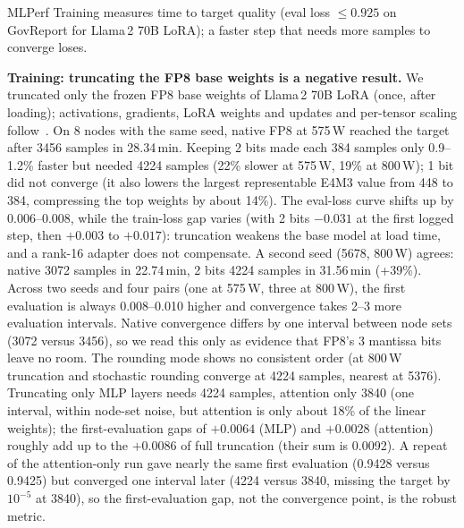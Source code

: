 \documentclass[conference]{IEEEtran}
\newcommand{\W}{\,W}
\newcommand{\pct}{\%}
\begin{document}
MLPerf Training measures time to target quality (eval loss $\le0.925$ on GovReport for Llama\,2 70B LoRA); a faster
step that needs more samples to converge loses.

\textbf{Training: truncating the FP8 base weights is a negative result.} We truncated only the frozen FP8 base weights
of Llama\,2 70B LoRA (once, after loading); activations, gradients, LoRA weights and updates and per-tensor scaling
follow~\cite{Micikevicius2022}. On 8 nodes with the same seed, native FP8 at 575\W{} reached the target after 3456
samples in 28.34\,min. Keeping 2 bits made each 384 samples only 0.9--1.2\pct{} faster but needed 4224 samples (22\pct{}
slower at 575\W, 19\pct{} at 800\W); 1 bit did not converge (it also lowers the largest representable E4M3 value
from 448 to 384, compressing the top weights by about 14\pct). The eval-loss curve shifts up by 0.006--0.008, while
the train-loss gap varies (with 2 bits $-0.031$ at the first logged step, then $+0.003$ to $+0.017$): truncation
weakens the base model at load time, and a rank-16 adapter does not compensate. A second seed (5678, 800\W) agrees: native 3072 samples in 22.74\,min,
2 bits 4224 samples in 31.56\,min (+39\pct). Across two seeds and four pairs (one at 575\W, three at 800\W), the first evaluation is always
0.008--0.010 higher and convergence takes 2--3 more evaluation intervals. Native convergence differs by one interval
between node sets (3072 versus 3456), so we read this only as evidence that FP8's 3 mantissa bits leave no room. The
rounding mode shows no consistent order (at 800\W{} truncation and stochastic rounding converge at 4224 samples,
nearest at 5376). Truncating only MLP layers needs 4224 samples, attention only 3840 (one interval, within node-set
noise, but attention is only about 18\pct{} of the linear weights); the first-evaluation gaps of $+0.0064$ (MLP) and
$+0.0028$ (attention) roughly add up to the $+0.0086$ of full truncation (their sum is 0.0092). A repeat of the
attention-only run gave nearly the
same first evaluation (0.9428 versus 0.9425) but converged one interval later (4224 versus 3840, missing the target by
$10^{-5}$ at 3840), so the first-evaluation gap, not the convergence point, is the robust metric.
\end{document}
